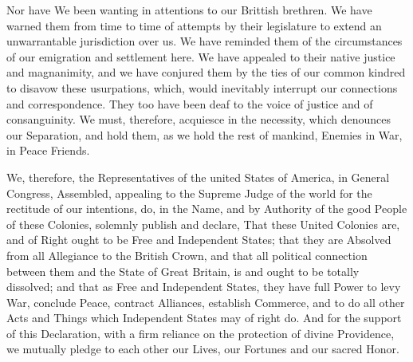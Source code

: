 Nor have We been wanting in attentions to our Brittish breth\-ren. We
have warned them from time to time of attempts by their legislature to
extend an unwarrantable jurisdiction over us. We have reminded them of
the circumstances of our emigration and settlement here. We have
appealed to their native justice and magnanimity, and we have conjured
them by the ties of our common kindred to disavow these usurpations,
which, would inevitably interrupt our connections and correspondence.
They too have been deaf to the voice of justice and of consanguinity.
We must, therefore, acquiesce in the necessity, which denounces our
Separation, and hold them, as we hold the rest of mankind, Enemies in
War, in Peace Friends.

We, therefore, the Representatives of the united States of America, in
General Congress, Assembled, appealing to the Supreme Judge of the
world for the rectitude of our intentions, do, in the Name, and by
Authority of the good People of these Colonies, solemnly publish and
declare, That these United Colonies are, and of Right ought to be Free
and Independent States; that they are Absolved from all Allegiance to
the British Crown, and that all political connection between them and
the State of Great Britain, is and ought to be totally dissolved; and
that as Free and Independent States, they have full Power to levy War,
conclude Peace, contract Alliances, establish Commerce, and to do all
other Acts and Things which Independent States may of right do. And
for the support of this Declaration, with a firm reliance on the
protection of divine Providence, we mutually pledge to each other our
Lives, our Fortunes and our sacred Honor.

